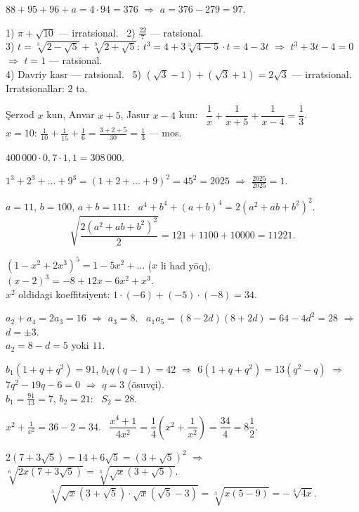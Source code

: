 




$88+95+96+a=4\cdot94=376$ $\Rightarrow$ $a=376-279=97$.

1) $\pi+\sqrt{10}$ — irratsional. \ 2) $\frac{22}7$ — ratsional.\\
3) $t=\sqrt[3]{2-\sqrt5}+\sqrt[3]{2+\sqrt5}$: $t^3=4+3\sqrt[3]{4-5}\cdot t=4-3t$ $\Rightarrow$ $t^3+3t-4=0$ $\Rightarrow$ $t=1$ — ratsional.\\
4) Davriy kasr — ratsional. \ 5) $(\sqrt3-1)+(\sqrt3+1)=2\sqrt3$ — irratsional.\\
Irratsionallar: $2$ ta.

Şerzod $x$ kun, Anvar $x+5$, Jasur $x-4$ kun: \ $\dfrac1x+\dfrac1{x+5}+\dfrac1{x-4}=\dfrac13$.\\
$x=10$: $\frac1{10}+\frac1{15}+\frac16=\frac{3+2+5}{30}=\frac13$ — mos.

$400\,000\cdot0{,}7\cdot1{,}1=308\,000$.

$1^3+2^3+\dots+9^3=(1+2+\dots+9)^2=45^2=2025$ $\Rightarrow$ $\frac{2025}{2025}=1$.

$a=11$, $b=100$, $a+b=111$: \ $a^4+b^4+(a+b)^4=2\left(a^2+ab+b^2\right)^2$.
\[\sqrt{\frac{2\left(a^2+ab+b^2\right)^2}2}=121+1100+10000=11221.\]

$\left(1-x^2+2x^3\right)^5=1-5x^2+\dots$ ($x$ li had yöq), \ $(x-2)^3=-8+12x-6x^2+x^3$.\\
$x^2$ oldidagi koeffitsiyent: $1\cdot(-6)+(-5)\cdot(-8)=34$.

$a_2+a_4=2a_3=16$ $\Rightarrow$ $a_3=8$. \ $a_1a_5=(8-2d)(8+2d)=64-4d^2=28$ $\Rightarrow$ $d=\pm3$.\\
$a_2=8-d=5$ yoki $11$.

$b_1(1+q+q^2)=91$, $b_1q(q-1)=42$ $\Rightarrow$ $6(1+q+q^2)=13(q^2-q)$ $\Rightarrow$ $7q^2-19q-6=0$ $\Rightarrow$ $q=3$ (ösuvçi).\\
$b_1=\frac{91}{13}=7$, $b_2=21$: \ $S_2=28$.

$x^2+\frac1{x^2}=36-2=34$. \ $\dfrac{x^4+1}{4x^2}=\dfrac14\left(x^2+\dfrac1{x^2}\right)=\dfrac{34}4=8\dfrac12$.

$2\left(7+3\sqrt5\right)=14+6\sqrt5=\left(3+\sqrt5\right)^2$ $\Rightarrow$ $\sqrt[6]{2x(7+3\sqrt5)}=\sqrt[3]{\sqrt x\left(3+\sqrt5\right)}$.
\[\sqrt[3]{\sqrt x\left(3+\sqrt5\right)\cdot\sqrt x\left(\sqrt5-3\right)}=\sqrt[3]{x(5-9)}=-\sqrt[3]{4x}.\]

